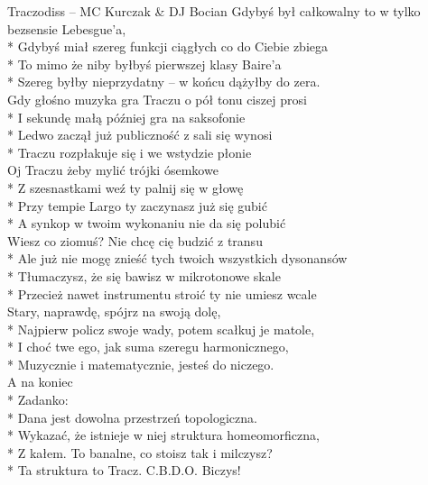 \begin{piosenka_dluga}{Traczodiss -- MC Kurczak \& DJ Bocian}
Gdybyś był całkowalny to w tylko bezsensie Lebesgue’a, \\*
Gdybyś miał szereg funkcji ciągłych co do Ciebie zbiega \\*
To mimo że niby byłbyś pierwszej klasy Baire’a \\*
Szereg byłby nieprzydatny -- w końcu dążyłby do zera. \\[\zwrotkaspace]

Gdy głośno muzyka gra Traczu o pół tonu ciszej prosi \\*
I sekundę małą później gra na saksofonie \\*
Ledwo zaczął już publiczność z sali się wynosi \\*
Traczu rozpłakuje się i we wstydzie płonie \\[\zwrotkaspace]

Oj Traczu żeby mylić trójki ósemkowe \\*
Z szesnastkami weź ty palnij się w głowę \\*
Przy tempie Largo ty zaczynasz już się gubić \\*
A synkop w twoim wykonaniu nie da się polubić \\[\zwrotkaspace]

Wiesz co ziomuś? Nie chcę cię budzić z transu \\*
Ale już nie mogę znieść tych twoich wszystkich dysonansów \\*
Tłumaczysz, że się bawisz w mikrotonowe skale \\*
Przecież nawet instrumentu stroić ty nie umiesz wcale \\[\zwrotkaspace]

Stary, naprawdę, spójrz na swoją dolę, \\*
Najpierw policz swoje wady, potem scałkuj je matole, \\*
I choć twe ego, jak suma szeregu harmonicznego, \\*
Muzycznie i matematycznie, jesteś do niczego. \\[\zwrotkaspace]

A na koniec \\*
Zadanko: \\*
Dana jest dowolna przestrzeń topologiczna. \\*
Wykazać, że istnieje w niej struktura homeomorficzna, \\*
Z kałem. To banalne, co stoisz tak i milczysz? \\*
Ta struktura to Tracz. C.B.D.O. Biczys! \\

\end{piosenka_dluga}